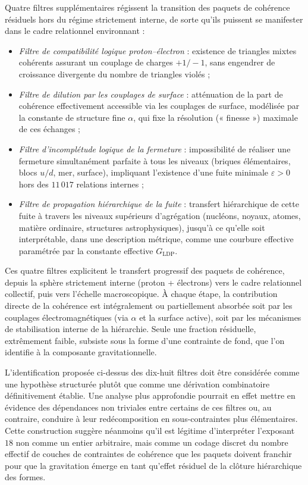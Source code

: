 \documentclass[11pt,a4paper]{article}
\begin{document}
Quatre filtres supplémentaires régissent la transition des paquets de cohérence résiduels hors du régime strictement interne, de sorte qu’ils puissent se manifester dans le cadre relationnel environnant :
\begin{itemize}
  \item \emph{Filtre de compatibilité logique proton–électron} : existence de triangles mixtes cohérents assurant un couplage de charges \(+1/-1\), sans engendrer de croissance divergente du nombre de triangles violés ;
  \item \emph{Filtre de dilution par les couplages de surface} : atténuation de la part de cohérence effectivement accessible via les couplages de surface, modélisée par la constante de structure fine \(\alpha\), qui fixe la résolution (« finesse ») maximale de ces échanges ;
  \item \emph{Filtre d’incomplétude logique de la fermeture} : impossibilité de réaliser une fermeture simultanément parfaite à tous les niveaux (briques élémentaires, blocs \(u/d\), mer, surface), impliquant l’existence d’une fuite minimale \(\varepsilon > 0\) hors des \(11\,017\) relations internes ;
  \item \emph{Filtre de propagation hiérarchique de la fuite} : transfert hiérarchique de cette fuite à travers les niveaux supérieurs d’agrégation (nucléons, noyaux, atomes, matière ordinaire, structures astrophysiques), jusqu’à ce qu’elle soit interprétable, dans une description métrique, comme une courbure effective paramétrée par la constante effective \(G_{\mathrm{LDP}}\).
\end{itemize}

Ces quatre filtres explicitent le transfert progressif des paquets de cohérence, depuis la sphère strictement interne (proton + électrons) vers le cadre relationnel collectif, puis vers l’échelle macroscopique. À chaque étape, la contribution directe de la cohérence est intégralement ou partiellement absorbée soit par les couplages électromagnétiques (via \(\alpha\) et la surface active), soit par les mécanismes de stabilisation interne de la hiérarchie. Seule une fraction résiduelle, extrêmement faible, subsiste sous la forme d’une contrainte de fond, que l’on identifie à la composante gravitationnelle.

L’identification proposée ci-dessus des dix-huit filtres doit être considérée comme une hypothèse structurée plutôt que comme une dérivation combinatoire définitivement établie. Une analyse plus approfondie pourrait en effet mettre en évidence des dépendances non triviales entre certains de ces filtres ou, au contraire, conduire à leur redécomposition en sous-contraintes plus élémentaires. Cette construction suggère néanmoins qu’il est légitime d’interpréter l’exposant \(18\) non comme un entier arbitraire, mais comme un codage discret du nombre effectif de couches de contraintes de cohérence que les paquets doivent franchir pour que la gravitation émerge en tant qu’effet résiduel de la clôture hiérarchique des formes.
\end{document}
